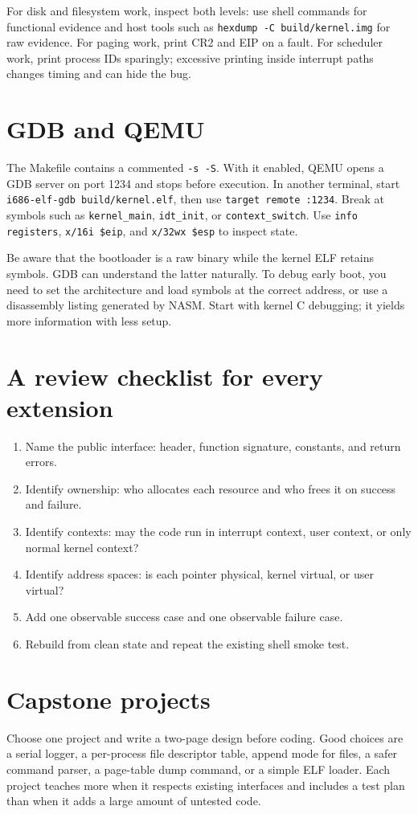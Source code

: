 For disk and filesystem work, inspect both levels: use shell commands for functional evidence and host tools such as \texttt{hexdump -C build/kernel.img} for raw evidence. For paging work, print CR2 and EIP on a fault. For scheduler work, print process IDs sparingly; excessive printing inside interrupt paths changes timing and can hide the bug.

\section{GDB and QEMU}
The Makefile contains a commented \texttt{-s -S}. With it enabled, QEMU opens a GDB server on port 1234 and stops before execution. In another terminal, start \texttt{i686-elf-gdb build/kernel.elf}, then use \texttt{target remote :1234}. Break at symbols such as \texttt{kernel\_main}, \texttt{idt\_init}, or \texttt{context\_switch}. Use \texttt{info registers}, \texttt{x/16i \$eip}, and \texttt{x/32wx \$esp} to inspect state.

Be aware that the bootloader is a raw binary while the kernel ELF retains symbols. GDB can understand the latter naturally. To debug early boot, you need to set the architecture and load symbols at the correct address, or use a disassembly listing generated by NASM. Start with kernel C debugging; it yields more information with less setup.

\section{A review checklist for every extension}
\begin{enumerate}
\item Name the public interface: header, function signature, constants, and return errors.
\item Identify ownership: who allocates each resource and who frees it on success and failure.
\item Identify contexts: may the code run in interrupt context, user context, or only normal kernel context?
\item Identify address spaces: is each pointer physical, kernel virtual, or user virtual?
\item Add one observable success case and one observable failure case.
\item Rebuild from clean state and repeat the existing shell smoke test.
\end{enumerate}

\section{Capstone projects}
Choose one project and write a two-page design before coding. Good choices are a serial logger, a per-process file descriptor table, append mode for files, a safer command parser, a page-table dump command, or a simple ELF loader. Each project teaches more when it respects existing interfaces and includes a test plan than when it adds a large amount of untested code.
